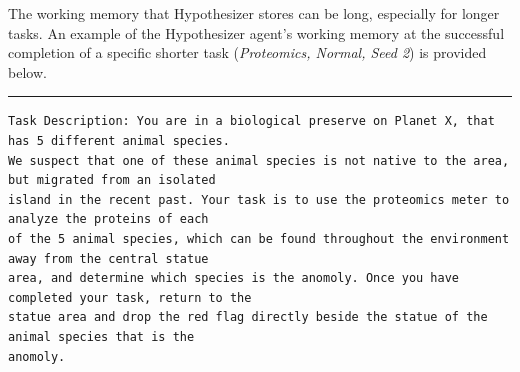 The working memory that Hypothesizer stores can be long, especially for longer tasks. An example of the Hypothesizer agent's working memory at the successful completion of a specific shorter task (\textit{Proteomics, Normal, Seed 2}) is provided below.  

\begin{scriptsize}
\rule{\textwidth}{0.5pt}
\begin{verbatim}
Task Description: You are in a biological preserve on Planet X, that has 5 different animal species. 
We suspect that one of these animal species is not native to the area, but migrated from an isolated 
island in the recent past. Your task is to use the proteomics meter to analyze the proteins of each 
of the 5 animal species, which can be found throughout the environment away from the central statue 
area, and determine which species is the anomoly. Once you have completed your task, return to the 
statue area and drop the red flag directly beside the statue of the animal species that is the 
anomoly.


\end{verbatim}
\end{scriptsize}
